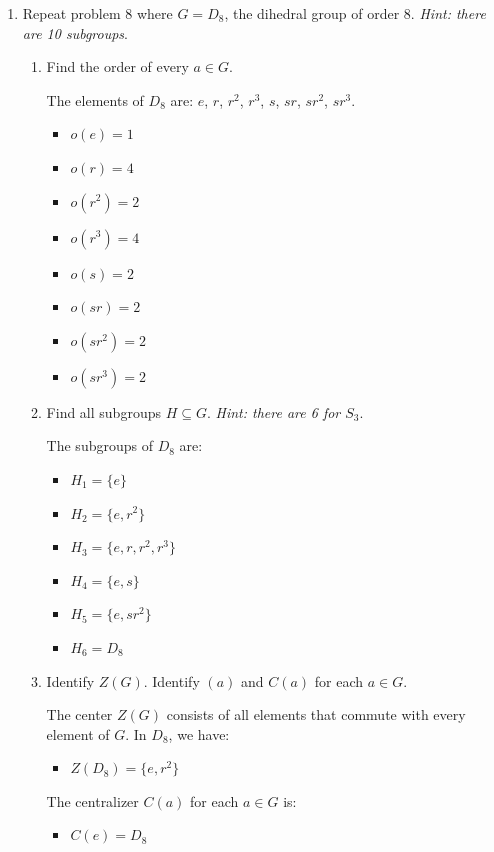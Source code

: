 \begin{enumerate}
  \newpage
  \item Repeat problem 8 where $G=D_8$, the dihedral group of order 8. 
  \textit{Hint: there are 10 subgroups}.
  \begin{enumerate}
    \item Find the order of every $a \in G$.
    \begin{subanswer}
      The elements of $D_8$ are: $e$, $r$, $r^2$, $r^3$, $s$, $sr$, $sr^2$, $sr^3$.
      \begin{itemize}
        \item $o(e) = 1$
        \item $o(r) = 4$
        \item $o(r^2) = 2$
        \item $o(r^3) = 4$
        \item $o(s) = 2$
        \item $o(sr) = 2$
        \item $o(sr^2) = 2$
        \item $o(sr^3) = 2$
      \end{itemize}
    \end{subanswer}
    \item Find all subgroups $H \subseteq G$. \textit{Hint: there are 6 for $S_3$}.
    \begin{subanswer}
      The subgroups of $D_8$ are:
      \begin{itemize}
        \item $H_1 = \{e\}$
        \item $H_2 = \{e, r^2\}$
        \item $H_3 = \{e, r, r^2, r^3\}$
        \item $H_4 = \{e, s\}$
        \item $H_5 = \{e, sr^2\}$
        \item $H_6 = D_8$
      \end{itemize}
    \end{subanswer}
    \item Identify $Z(G)$. Identify $(a)$ and $C(a)$ for each $a \in G$.
    \begin{subanswer}
      The center $Z(G)$ consists of all elements that commute with every element of $G$. In $D_8$, we have:
      \begin{itemize}
        \item $Z(D_8) = \{e, r^2\}$
      \end{itemize}
      The centralizer $C(a)$ for each $a \in G$ is:
      \begin{itemize}
        \item $C(e) = D_8$

\end{itemize}
\end{subanswer}
\end{enumerate}
\end{enumerate}
